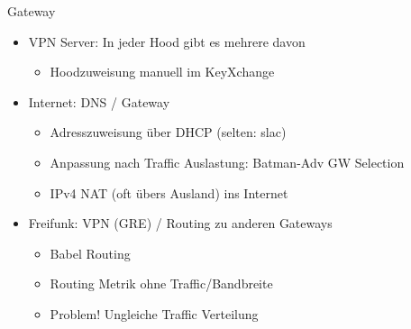 \begin{frame}{Gateway}
    \begin{itemize}
        \item VPN Server: In jeder Hood gibt es mehrere davon
        \begin{itemize}
            \item Hoodzuweisung manuell im KeyXchange
        \end{itemize}
        \item Internet: DNS / Gateway
        \begin{itemize}
            \item Adresszuweisung über DHCP (selten: slac)
            \item Anpassung nach Traffic Auslastung: Batman-Adv GW Selection
            \item IPv4 NAT (oft übers Ausland) ins Internet
        \end{itemize}
        \item Freifunk: VPN (GRE) / Routing zu anderen Gateways
        \begin{itemize}
            \item Babel Routing
            \item Routing Metrik ohne Traffic/Bandbreite
            \item<2> {\color{red}Problem!} Ungleiche Traffic Verteilung
        \end{itemize}
    \end{itemize}
\end{frame}
